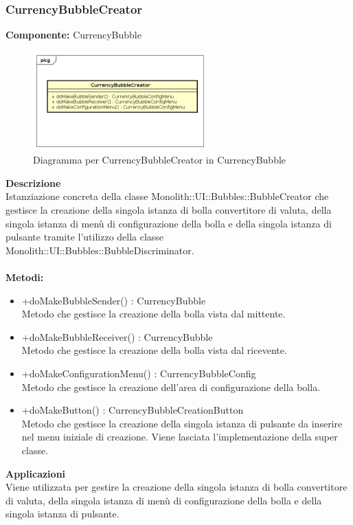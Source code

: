 \subsubsection{CurrencyBubbleCreator}
\textbf{Componente:}  CurrencyBubble\\
   \FloatBarrier
   \begin{figure}[ht]
   \centering
   \includegraphics[width=0.6\textwidth]{img/single-CurrencyBubbleCreator}
   \caption{{Diagramma per CurrencyBubbleCreator in CurrencyBubble}}
\end{figure}
\FloatBarrier
\textbf{Descrizione}\\
Istanziazione concreta della classe Monolith::UI::Bubbles::BubbleCreator che gestisce la creazione della singola istanza di bolla convertitore di valuta, della singola istanza di menù di configurazione della bolla e della singola istanza di pulsante tramite l'utilizzo della classe Monolith::UI::Bubbles::BubbleDiscriminator.
\\
\\
\textbf{Metodi:} 
\begin{itemize}
\item +doMakeBubbleSender() : CurrencyBubble 
\\
Metodo che gestisce la creazione della bolla vista dal mittente.
\item +doMakeBubbleReceiver() : CurrencyBubble 
\\
Metodo che gestisce la creazione della bolla vista dal ricevente.
\item +doMakeConfigurationMenu() : CurrencyBubbleConfig 
\\
Metodo che gestisce la creazione dell'area di configurazione della bolla.
\item +doMakeButton() : CurrencyBubbleCreationButton 
\\
Metodo che gestisce la creazione della singola istanza di pulsante da inserire nel menu iniziale di creazione. Viene lasciata l'implementazione della super classe.
\end{itemize} 


\textbf{Applicazioni}\\
Viene utilizzata per gestire la creazione della singola istanza di bolla convertitore di valuta, della singola istanza di menù di configurazione della bolla e della singola istanza di pulsante. 


